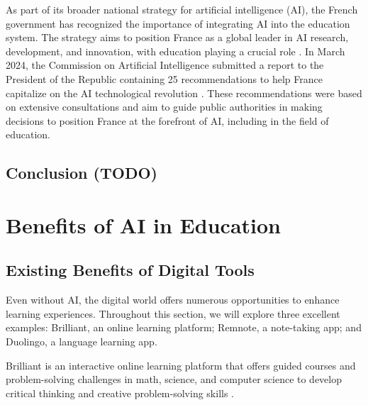 \documentclass{article}
\begin{document}
As part of its broader national strategy for artificial intelligence (AI), the French government has recognized the importance of integrating AI into the education system. The strategy aims to position France as a global leader in AI research, development, and innovation, with education playing a crucial role \cite{https://www.economie.gouv.fr/strategie-nationale-intelligence-artificielle} \cite{https://www.entreprises.gouv.fr/fr/numerique/enjeux/la-strategie-nationale-pour-l-ia}. In March 2024, the Commission on Artificial Intelligence submitted a report to the President of the Republic containing 25 recommendations to help France capitalize on the AI technological revolution \cite{https://edunumrech.hypotheses.org/11602} \cite{https://www.ac-paris.fr/l-intelligence-artificielle-dans-l-education-130992} \cite{https://www.campusmatin.com/numerique/equipements-systemes-informations/commission-ia-les-recommandations-pour-l-enseignement-superieur-et-la-recherche.html}. These recommendations were based on extensive consultations and aim to guide public authorities in making decisions to position France at the forefront of AI, including in the field of education.




\subsection{Conclusion (TODO)} %

\newpage


\section{Benefits of AI in Education}

\subsection{Existing Benefits of Digital Tools}

Even without AI, the digital world offers numerous opportunities to enhance learning experiences. Throughout this section, we will explore three excellent examples: Brilliant, an online learning platform; Remnote, a note-taking app; and Duolingo, a language learning app.

Brilliant is an interactive online learning platform that offers guided courses and problem-solving challenges in math, science, and computer science to develop critical thinking and creative problem-solving skills \cite{https://brilliant.org/}.
\end{document}
